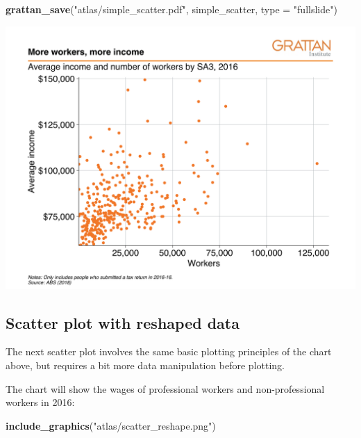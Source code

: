 \documentclass[]{book}
\newenvironment{Shaded}{\begin{snugshade}}{\end{snugshade}}
\newcommand{\DataTypeTok}[1]{\textcolor[rgb]{0.13,0.29,0.53}{#1}}
\newcommand{\KeywordTok}[1]{\textcolor[rgb]{0.13,0.29,0.53}{\textbf{#1}}}
\newcommand{\NormalTok}[1]{#1}
\newcommand{\StringTok}[1]{\textcolor[rgb]{0.31,0.60,0.02}{#1}}
\begin{document}
\begin{Shaded}
\begin{Highlighting}[]
\KeywordTok{grattan_save}\NormalTok{(}\StringTok{"atlas/simple_scatter.pdf"}\NormalTok{, simple_scatter, }\DataTypeTok{type =} \StringTok{"fullslide"}\NormalTok{)}
\end{Highlighting}
\end{Shaded}

\includegraphics[width=44.44in]{atlas/simple_scatter}

\hypertarget{scatter-plot-with-reshaped-data}{%
\subsection{Scatter plot with reshaped data}\label{scatter-plot-with-reshaped-data}}

The next scatter plot involves the same basic plotting principles of the chart above, but requires a bit more data manipulation before plotting.

The chart will show the wages of professional workers and non-professional workers in 2016:

\begin{Shaded}
\begin{Highlighting}[]
\KeywordTok{include_graphics}\NormalTok{(}\StringTok{"atlas/scatter_reshape.png"}\NormalTok{)}
\end{Highlighting}
\end{Shaded}
\end{document}
